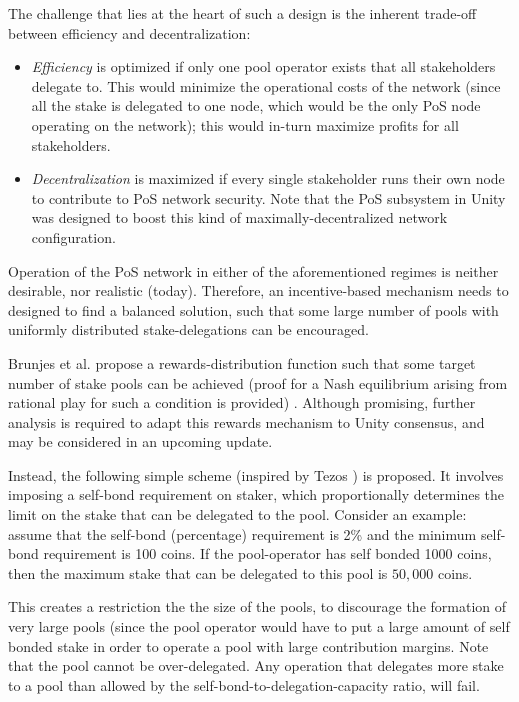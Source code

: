 The challenge that lies at the heart of such a design is the inherent trade-off between efficiency and decentralization: 
\begin{itemize}[label=--,nosep]
    \item \textit{Efficiency} is optimized if only one pool operator exists that all stakeholders delegate to. This would minimize the operational costs of the network (since all the stake is delegated to one node, which would be the only PoS node operating on the network); this would in-turn maximize profits for all stakeholders. 
    \item \textit{Decentralization} is maximized if every single stakeholder runs their own node to contribute to PoS network security. Note that the PoS subsystem in Unity was designed to boost this kind of maximally-decentralized network configuration. 
\end{itemize}

Operation of the PoS network in either of the aforementioned regimes is neither desirable, nor realistic (today). Therefore, an incentive-based mechanism needs to designed to find a balanced solution, such that some large number of pools with uniformly distributed stake-delegations can be encouraged. 

Brunjes et al. propose a rewards-distribution function such that some target number of stake pools can be achieved (proof for a Nash equilibrium arising from rational play for such a condition is provided) \cite{BKK+18}. Although promising, further analysis is required to adapt this rewards mechanism to Unity consensus, and may be considered in an upcoming update. 

Instead, the following simple scheme (inspired by Tezos \cite{Goo14}) is proposed. It involves imposing a self-bond requirement on staker, which proportionally determines the limit on the stake that can be delegated to the pool. Consider an example: assume that the self-bond (percentage) requirement is 2\% and the minimum self-bond requirement is 100 coins. If the pool-operator has self bonded 1000 coins, then the maximum stake that can be delegated to this pool is $50,000$ coins.   

This creates a restriction the the size of the pools, to discourage the formation of very large pools (since the pool operator would have to put a large amount of self bonded stake in order to operate a pool with large contribution margins. Note that the pool cannot be over-delegated. Any operation that delegates more stake to a pool than allowed by the self-bond-to-delegation-capacity ratio, will fail. 

